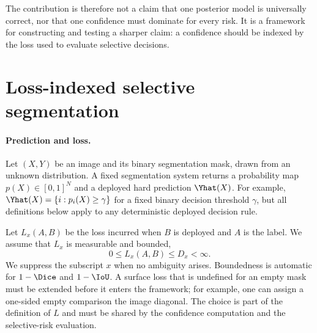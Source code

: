 The contribution is therefore not a claim that one posterior model is universally
correct, nor that one confidence must dominate for every risk. It is a framework for
constructing and testing a sharper claim: a confidence should be indexed by the loss
used to evaluate selective decisions.

\section{Loss-indexed selective segmentation}\label{sec:setup}

\paragraph{Prediction and loss.}
Let $(X,Y)$ be an image and its binary segmentation mask, drawn from an unknown
distribution. A fixed segmentation system returns a probability map
$p(X)\in[0,1]^N$ and a deployed hard prediction $\Yhat(X)$. For example,
$\Yhat(X)=\{i:p_i(X)\geq\gamma\}$ for a fixed binary decision threshold $\gamma$,
but all definitions below apply to any deterministic deployed decision rule.

Let $L_x(A,B)$ be the loss incurred when $B$ is deployed and $A$ is the label. We
assume that $L_x$ is measurable and bounded,
\begin{equation}\label{eq:bounded-assumption}
  0\leq L_x(A,B)\leq D_x<\infty.
\end{equation}
We suppress the subscript $x$ when no ambiguity arises. Boundedness is automatic for
$1-\Dice$ and $1-\IoU$. A surface loss that is undefined for an empty mask must be
extended before it enters the framework; for example, one can assign a one-sided
empty comparison the image diagonal. The choice is part of the definition of $L$ and
must be shared by the confidence computation and the selective-risk evaluation.

